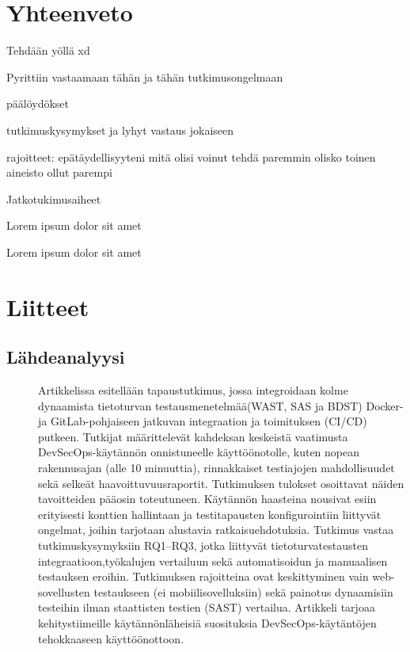 \documentclass[bscthesis,finnish,oneside,biblatex]{uefcsthesis}
\begin{document}





    \chapter{Yhteenveto}
    \label{cha:yhteenveto}

    Tehdään yöllä xd

    Pyrittiin vastaamaan tähän ja tähän tutkimusongelmaan

    päälöydökset

    tutkimuskysymykset ja lyhyt vastaus jokaiseen

    rajoitteet: epätäydellisyyteni mitä olisi voinut tehdä paremmin olisko toinen aineisto ollut parempi

    Jatkotukimusaiheet

    Lorem ipsum dolor sit amet\citep{zafari2019survey}

    \citet{zafari2019survey} Lorem ipsum dolor sit amet

    \printbibliography[heading=bibintoc]

    \backmatter %


    \chapter{Liitteet}


    \section{Lähdeanalyysi}
    \label{sec:source-analysis}
    \begin{description}
        \item[\cite{rangnau2020_cst}] Artikkelissa esitellään tapaustutkimus, jossa integroidaan kolme dynaamista tietoturvan testausmenetelmää(WAST, SAS ja BDST) Docker- ja GitLab-pohjaiseen jatkuvan integraation ja toimituksen (CI/CD) putkeen. Tutkijat määrittelevät kahdeksan keskeistä vaatimusta DevSecOps-käytännön onnistuneelle käyttöönotolle, kuten nopean rakennusajan (alle 10 minuuttia), rinnakkaiset testiajojen mahdollisuudet sekä selkeät haavoittuvuusraportit. Tutkimuksen tulokset osoittavat näiden tavoitteiden pääosin toteutuneen. Käytännön haasteina nousivat esiin erityisesti konttien hallintaan ja testitapausten konfigurointiin liittyvät ongelmat, joihin tarjotaan alustavia ratkaisuehdotuksia. Tutkimus vastaa tutkimuskysymyksiin RQ1–RQ3, jotka liittyvät tietoturvatestausten integraatioon,työkalujen vertailuun sekä automatisoidun ja manuaalisen testauksen eroihin. Tutkimuksen rajoitteina ovat keskittyminen vain web-sovellusten testaukseen (ei mobiilisovelluksiin) sekä painotus dynaamisiin testeihin ilman staattisten testien (SAST) vertailua. Artikkeli tarjoaa kehitystiimeille käytännönläheisiä suosituksia DevSecOps-käytäntöjen tehokkaaseen käyttöönottoon.
    \end{description}
\end{document}
